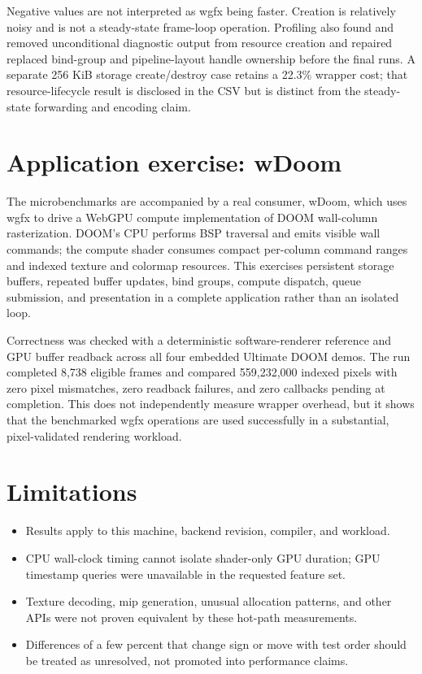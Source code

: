 \documentclass[11pt]{article}
\begin{document}
Negative values are not interpreted as wgfx being faster. Creation is relatively
noisy and is not a steady-state frame-loop operation. Profiling also found and
removed unconditional diagnostic output from resource creation and repaired
replaced bind-group and pipeline-layout handle ownership before the final runs.
A separate 256 KiB storage create/destroy case retains a 22.3\% wrapper cost;
that resource-lifecycle result is disclosed in the CSV but is distinct from the
steady-state forwarding and encoding claim.

\section{Application exercise: wDoom}

The microbenchmarks are accompanied by a real consumer, wDoom, which uses wgfx
to drive a WebGPU compute implementation of DOOM wall-column rasterization.
DOOM's CPU performs BSP traversal and emits visible wall commands; the compute
shader consumes compact per-column command ranges and indexed texture and
colormap resources. This exercises persistent storage buffers, repeated buffer
updates, bind groups, compute dispatch, queue submission, and presentation in a
complete application rather than an isolated loop.

Correctness was checked with a deterministic software-renderer reference and
GPU buffer readback across all four embedded Ultimate DOOM demos. The run
completed 8,738 eligible frames and compared 559,232,000 indexed pixels with
zero pixel mismatches, zero readback failures, and zero callbacks pending at
completion. This does not independently measure wrapper overhead, but it shows
that the benchmarked wgfx operations are used successfully in a substantial,
pixel-validated rendering workload.

\section{Limitations}

\begin{itemize}
  \item Results apply to this machine, backend revision, compiler, and workload.
  \item CPU wall-clock timing cannot isolate shader-only GPU duration; GPU
        timestamp queries were unavailable in the requested feature set.
  \item Texture decoding, mip generation, unusual allocation patterns, and
        other APIs were not proven equivalent by these hot-path measurements.
  \item Differences of a few percent that change sign or move with test order
        should be treated as unresolved, not promoted into performance claims.
\end{itemize}
\end{document}
